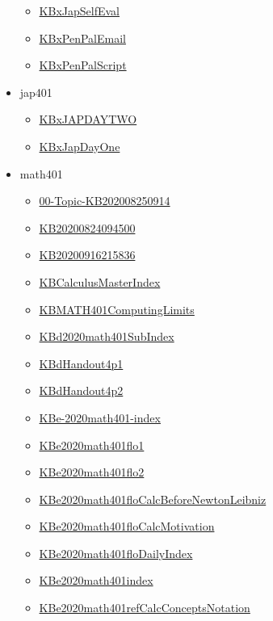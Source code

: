 \documentclass[11pt]{article}
\begin{document}
\begin{itemize}
\begin{itemize}
\item \href{jap201/KBxJapSelfEval.org}{KBxJapSelfEval}
\item \href{jap201/KBxPenPalEmail.org}{KBxPenPalEmail}
\item \href{jap201/KBxPenPalScript.org}{KBxPenPalScript}
\end{itemize}
\item jap401
\begin{itemize}
\item \href{jap401/KBxJAPDAYTWO.org}{KBxJAPDAYTWO}
\item \href{jap401/KBxJapDayOne.org}{KBxJapDayOne}
\end{itemize}
\item math401
\begin{itemize}
\item \href{math401/00-Topic-KB202008250914.org}{00-Topic-KB202008250914}
\item \href{math401/KB20200824094500.org}{KB20200824094500}
\item \href{math401/KB20200916215836.org}{KB20200916215836}
\item \href{math401/KBCalculusMasterIndex.org}{KBCalculusMasterIndex}
\item \href{math401/KBMATH401ComputingLimits.org}{KBMATH401ComputingLimits}
\item \href{math401/KBd2020math401SubIndex.org}{KBd2020math401SubIndex}
\item \href{math401/KBdHandout4p1.org}{KBdHandout4p1}
\item \href{math401/KBdHandout4p2.org}{KBdHandout4p2}
\item \href{math401/KBe-2020math401-index.org}{KBe-2020math401-index}
\item \href{math401/KBe2020math401flo1.org}{KBe2020math401flo1}
\item \href{math401/KBe2020math401flo2.org}{KBe2020math401flo2}
\item \href{math401/KBe2020math401floCalcBeforeNewtonLeibniz.org}{KBe2020math401floCalcBeforeNewtonLeibniz}
\item \href{math401/KBe2020math401floCalcMotivation.org}{KBe2020math401floCalcMotivation}
\item \href{math401/KBe2020math401floDailyIndex.org}{KBe2020math401floDailyIndex}
\item \href{math401/KBe2020math401index.org}{KBe2020math401index}
\item \href{math401/KBe2020math401refCalcConceptsNotation.org}{KBe2020math401refCalcConceptsNotation}

\end{itemize}
\end{itemize}
\end{document}
